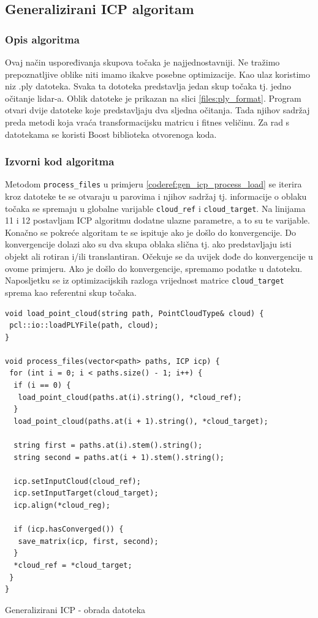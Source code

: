 \subsection{Generalizirani ICP algoritam}

\subsubsection{Opis algoritma}
Ovaj način uspoređivanja skupova točaka je najjednostavniji. Ne tražimo prepoznatljive oblike niti imamo ikakve posebne optimizacije. Kao ulaz koristimo niz .ply datoteka. Svaka ta dototeka predstavlja jedan skup točaka tj. jedno očitanje lidar-a. Oblik datoteke je prikazan na slici \ref{files:ply_format}. Program otvari dvije datoteke koje predstavljaju dva sljedna očitanja. Tada njihov sadržaj preda metodi koja vraća transformacijsku matricu i fitnes veličinu. Za rad s datotekama se koristi Boost biblioteka otvorenoga koda.


\subsubsection{Izvorni kod algoritma}
Metodom \texttt{process_files} u primjeru \ref{coderef:gen_icp_process_load} se iterira kroz datoteke te se otvaraju u parovima i njihov sadržaj tj. informacije o oblaku točaka se spremaju u globalne varijable \texttt{cloud_ref} i \texttt{cloud_target}. Na linijama 11 i 12 postavljam ICP algoritmu dodatne ulazne parametre, a to su te varijable. Konačno se pokreće algoritam te se ispituje ako je došlo do konvergencije. Do konvergencije dolazi ako su dva skupa oblaka slična tj. ako predstavljaju isti objekt ali rotiran i/ili translantiran. Očekuje se da uvijek dođe do konvergencije u ovome primjeru. Ako je došlo do konvergencije, spremamo podatke u datoteku. Naposljetku se iz optimizacijskih razloga vrijednost matrice \texttt{cloud_target} sprema kao referentni skup točaka.
\begin{listing}[H]
  \begin{verbatim}
void load_point_cloud(string path, PointCloudType& cloud) {
 pcl::io::loadPLYFile(path, cloud);
}

void process_files(vector<path> paths, ICP icp) {
 for (int i = 0; i < paths.size() - 1; i++) {
  if (i == 0) {
   load_point_cloud(paths.at(i).string(), *cloud_ref);
  }
  load_point_cloud(paths.at(i + 1).string(), *cloud_target);

  string first = paths.at(i).stem().string();
  string second = paths.at(i + 1).stem().string();

  icp.setInputCloud(cloud_ref);
  icp.setInputTarget(cloud_target);
  icp.align(*cloud_reg);

  if (icp.hasConverged()) {
   save_matrix(icp, first, second);
  }
  *cloud_ref = *cloud_target;
 }
}
  \end{verbatim}
  \caption{Generalizirani ICP - obrada datoteka}
  \label{coderef:gen_icp_process_load}
\end{listing}

